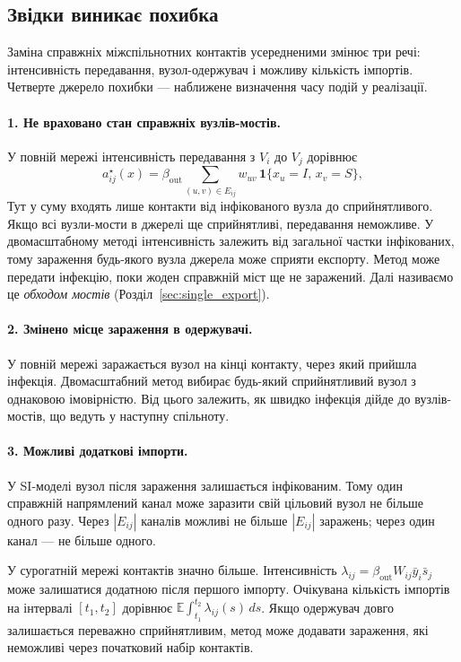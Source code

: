\documentclass[a4paper,fleqn]{cas-sc}
\newcommand{\ibar}{\bar{y}}
\newcommand{\sbar}{\bar{s}}
\newcommand{\ind}{\mathbf{1}}
\begin{document}
\subsection{Звідки виникає похибка}
\label{sec:sources}

Заміна справжніх міжспільнотних контактів усередненими змінює три речі: інтенсивність передавання, вузол-одержувач і можливу кількість імпортів. Четверте джерело похибки --- наближене визначення часу подій у реалізації.

\paragraph{1. Не враховано стан справжніх вузлів-мостів.}
У повній мережі інтенсивність передавання з $V_i$ до $V_j$ дорівнює
\begin{equation}
\label{eq:exact_rate}
a^\star_{ij}(x)=\beta_{\mathrm{out}}\sum_{(u,v)\in E_{ij}}w_{uv}\,\ind\{x_u=I,\,x_v=S\},
\end{equation}
Тут у суму входять лише контакти від інфікованого вузла до сприйнятливого. Якщо всі вузли-мости в джерелі ще сприйнятливі, передавання неможливе. У двомасштабному методі інтенсивність залежить від загальної частки інфікованих, тому зараження будь-якого вузла джерела може сприяти експорту. Метод може передати інфекцію, поки жоден справжній міст ще не заражений. Далі називаємо це \emph{обходом мостів} (Розділ~\ref{sec:single_export}).

\paragraph{2. Змінено місце зараження в одержувачі.}
У повній мережі заражається вузол на кінці контакту, через який прийшла інфекція. Двомасштабний метод вибирає будь-який сприйнятливий вузол з однаковою імовірністю. Від цього залежить, як швидко інфекція дійде до вузлів-мостів, що ведуть у наступну спільноту.

\paragraph{3. Можливі додаткові імпорти.}
У SI-моделі вузол після зараження залишається інфікованим. Тому один справжній напрямлений канал може заразити свій цільовий вузол не більше одного разу. Через $|E_{ij}|$ каналів можливі не більше $|E_{ij}|$ заражень; через один канал --- не більше одного.
\par У сурогатній мережі контактів значно більше. Інтенсивність $\lambda_{ij}=\beta_{\mathrm{out}}W_{ij}\ibar_i\sbar_j$ може залишатися додатною після першого імпорту. Очікувана кількість імпортів на інтервалі $[t_1,t_2]$ дорівнює $\mathbb{E}\int_{t_1}^{t_2}\lambda_{ij}(s)\,ds$. Якщо одержувач довго залишається переважно сприйнятливим, метод може додавати зараження, які неможливі через початковий набір контактів.
\end{document}
